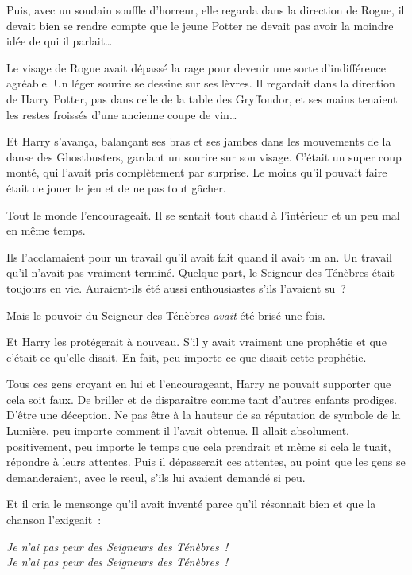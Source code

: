 {Puis, avec un soudain souffle d'horreur, elle regarda dans la direction de Rogue, il devait bien se rendre compte que le jeune Potter ne devait pas avoir la moindre idée de qui il parlait…

Le visage de Rogue avait dépassé la rage pour devenir une sorte d'indifférence agréable. Un léger sourire se dessine sur ses lèvres. Il regardait dans la direction de Harry Potter, pas dans celle de la table des Gryffondor, et ses mains tenaient les restes froissés d'une ancienne coupe de vin…

Et Harry s'avança, balançant ses bras et ses jambes dans les mouvements de la danse des Ghostbusters, gardant un sourire sur son visage. C'était un super coup monté, qui l'avait pris complètement par surprise. Le moins qu'il pouvait faire était de jouer le jeu et de ne pas tout gâcher.

Tout le monde l'encourageait. Il se sentait tout chaud à l'intérieur et un peu mal en même temps.

Ils l'acclamaient pour un travail qu'il avait fait quand il avait un an. Un travail qu'il n'avait pas vraiment terminé. Quelque part, le Seigneur des Ténèbres était toujours en vie. Auraient-ils été aussi enthousiastes s'ils l'avaient su~?

Mais le pouvoir du Seigneur des Ténèbres \emph{avait} été brisé une fois.

Et Harry les protégerait à nouveau. S'il y avait vraiment une prophétie et que c'était ce qu'elle disait. En fait, peu importe ce que disait cette prophétie.

Tous ces gens croyant en lui et l'encourageant, Harry ne pouvait supporter que cela soit faux. De briller et de disparaître comme tant d'autres enfants prodiges. D'être une déception. Ne pas être à la hauteur de sa réputation de symbole de la Lumière, peu importe comment il l'avait obtenue. Il allait absolument, positivement, peu importe le temps que cela prendrait et même si cela le tuait, répondre à leurs attentes. Puis il dépasserait ces attentes, au point que les gens se demanderaient, avec le recul, s'ils lui avaient demandé si peu.

Et il cria le mensonge qu'il avait inventé parce qu'il résonnait bien et que la chanson l'exigeait~:

\begin{center}
\emph{Je n'ai pas peur des Seigneurs des Ténèbres~!}\\
\emph{Je n'ai pas peur des Seigneurs des Ténèbres~!}
\end{center}

}
